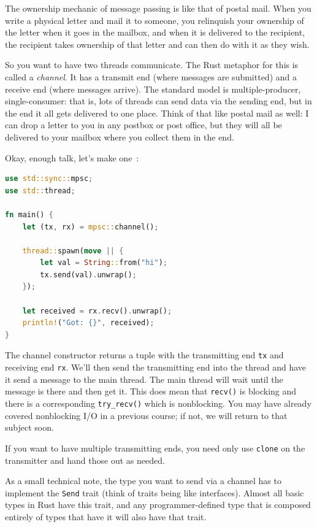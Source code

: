 The ownership mechanic of message passing is like that of postal mail. When you write a physical letter and mail it to someone, you relinquish your ownership of the letter when it goes in the mailbox, and when it is delivered to the recipient, the recipient takes ownership of that letter and can then do with it as they wish.

So you want to have two threads communicate. The Rust metaphor for this is called a \textit{channel}. It has a transmit end (where messages are submitted) and a receive end (where messages arrive). The standard model is multiple-producer, single-consumer: that is, lots of threads can send data via the sending end, but in the end it all gets delivered to one place. Think of that like postal mail as well: I can drop a letter to you in any postbox or post office, but they will all be delivered to your mailbox where you collect them in the end.

Okay, enough talk, let's make one~\cite{rustdocs}:
\begin{lstlisting}[language=Rust]
use std::sync::mpsc;
use std::thread;

fn main() {
    let (tx, rx) = mpsc::channel();

    thread::spawn(move || {
        let val = String::from("hi");
        tx.send(val).unwrap();
    });

    let received = rx.recv().unwrap();
    println!("Got: {}", received);
}
\end{lstlisting}

The channel constructor returns a tuple with the transmitting end \texttt{tx} and receiving end \texttt{rx}. We'll then send the transmitting end into the thread and have it send a message to the main thread. The main thread will wait until the message is there and then get it. This does mean that \texttt{recv()} is blocking and there is a corresponding \texttt{try\_recv()} which is nonblocking. You may have already covered nonblocking I/O in a previous course; if not, we will return to that subject soon.

If you want to have multiple transmitting ends, you need only use \texttt{clone} on the transmitter and hand those out as needed. 

As a small technical note, the type you want to send via a channel has to implement the \texttt{Send} trait (think of traits being like interfaces). Almost all basic types in Rust have this trait, and any programmer-defined type that is composed entirely of types that have it will also have that trait.  


